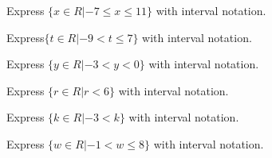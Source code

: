 \documentclass{ximera}
\begin{document}
\begin{exercise}
Express $ \{  x \in R | -7 \leq x \leq 11  \} $ with interval notation.

\begin{multipleChoice}
\choice[correct]{[-7, 11]}
\choice{(-7, 11]}
\choice{[-7, 11)}
\end{multipleChoice}

\end{exercise}





\begin{exercise}
Express$ \{  t \in R | -9 < t \leq 7  \} $ with interval notation. 

\begin{multipleChoice}
\choice{[-9, 7]}
\choice[correct]{(-9, 7]}
\choice{[-9, 7)}
\end{multipleChoice}

\end{exercise}







\begin{exercise}
Express $ \{  y \in R | -3 < y < 0  \} $ with interval notation.

\begin{multipleChoice}
\choice{[-3, 0]}
\choice{(-3, 0]}
\choice{[-3, 0)}
\end{multipleChoice}

\end{exercise}








\begin{exercise}
Express  $ \{  r \in R | r < 6  \} $ with interval notation.

\begin{multipleChoice}
\choice{[-\infty, 6]}
\choice{[6, -\infty)}
\end{multipleChoice}

\end{exercise}






\begin{exercise}
Express $ \{  k \in R | -3 < k  \} $ with interval notation.

\begin{multipleChoice}
\choice{[-3, \infty]}
\choice{[-3, \infty)}
\end{multipleChoice}

\end{exercise}





\begin{exercise}
Express $ \{  w \in R | -1 < w \leq 8  \} $ with interval notation.

\begin{multipleChoice}
\choice{[-1, 8]}
\choice{[-1, 8)}
\choice[correct]{(-1, 8]}
\end{multipleChoice}

\end{exercise}
\end{document}
